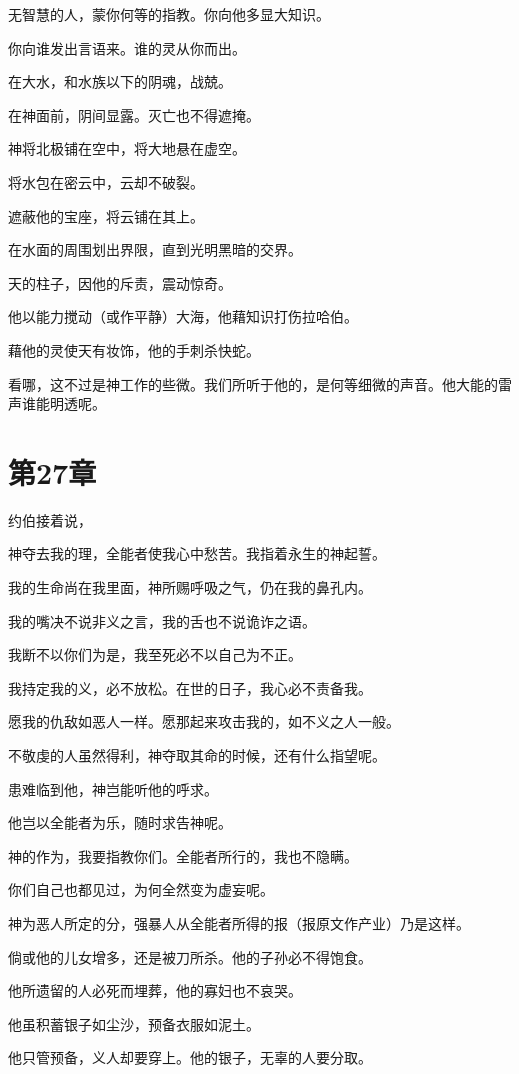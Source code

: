 \documentclass[12pt,oneside]{book}
\begin{document}
无智慧的人，蒙你何等的指教。你向他多显大知识。

你向谁发出言语来。谁的灵从你而出。

在大水，和水族以下的阴魂，战兢。

在神面前，阴间显露。灭亡也不得遮掩。

神将北极铺在空中，将大地悬在虚空。

将水包在密云中，云却不破裂。

遮蔽他的宝座，将云铺在其上。

在水面的周围划出界限，直到光明黑暗的交界。

天的柱子，因他的斥责，震动惊奇。

他以能力搅动（或作平静）大海，他藉知识打伤拉哈伯。

藉他的灵使天有妆饰，他的手刺杀快蛇。

看哪，这不过是神工作的些微。我们所听于他的，是何等细微的声音。他大能的雷声谁能明透呢。


\chapter{第27章}
约伯接着说，

神夺去我的理，全能者使我心中愁苦。我指着永生的神起誓。

我的生命尚在我里面，神所赐呼吸之气，仍在我的鼻孔内。

我的嘴决不说非义之言，我的舌也不说诡诈之语。

我断不以你们为是，我至死必不以自己为不正。

我持定我的义，必不放松。在世的日子，我心必不责备我。

愿我的仇敌如恶人一样。愿那起来攻击我的，如不义之人一般。

不敬虔的人虽然得利，神夺取其命的时候，还有什么指望呢。

患难临到他，神岂能听他的呼求。

他岂以全能者为乐，随时求告神呢。

神的作为，我要指教你们。全能者所行的，我也不隐瞒。

你们自己也都见过，为何全然变为虚妄呢。

神为恶人所定的分，强暴人从全能者所得的报（报原文作产业）乃是这样。

倘或他的儿女增多，还是被刀所杀。他的子孙必不得饱食。

他所遗留的人必死而埋葬，他的寡妇也不哀哭。

他虽积蓄银子如尘沙，预备衣服如泥土。

他只管预备，义人却要穿上。他的银子，无辜的人要分取。
\end{document}
